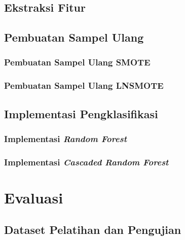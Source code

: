 \documentclass[12pt,a4paper,titlepage]{report}
\begin{document}
\section{Ekstraksi Fitur}
\label{section:ekstraksi_fitur}


\section{Pembuatan Sampel Ulang}


\subsection{Pembuatan Sampel Ulang SMOTE}

\newpage


\newpage
\subsection{Pembuatan Sampel Ulang LNSMOTE}



\newpage
\section{Implementasi Pengklasifikasi}


\subsection{Implementasi \textit{Random Forest}}
\label{subsection:implementasi_rf}



\subsection{Implementasi \textit{Cascaded Random Forest}}
\label{subsection:implementasi_crf}


\newpage


\chapter{Evaluasi}
\label{bab:evaluasi}


\section{Dataset Pelatihan dan Pengujian}
\label{section:dataset}

\end{document}
